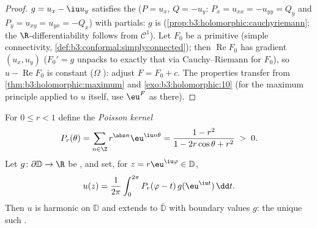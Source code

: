 \begin{proof}
$g = u_x - \iu u_y$ satisfies the 
($P = u_x$, $Q = -u_y$: $P_x = u_{xx} = -u_{yy} = Q_y$ and
$P_y = u_{xy} = u_{yx} = -Q_x$) with  partials: $g$
is  (\cref{prop:b3:holomorphic:cauchyriemann}; the
$\R$-differentiability follows from $\mathcal C^1$). Let $F_0$
be a primitive (simple connectivity,
\cref{def:b3:conformal:simplyconnected}); then
$\operatorname{Re}F_0$ has gradient $(u_x, u_y)$
($F_0' = g$ unpacks to exactly that via Cauchy--Riemann for
$F_0$), so $u - \operatorname{Re}F_0$ is constant ($\Omega$
): adjust $F = F_0 + c$. The properties transfer
from \cref{thm:b3:holomorphic:maximum} and
\cref{exo:b3:holomorphic:10} (for the maximum principle
applied to $u$ itself, use $\eu^{F}$ as there).
\end{proof}

\begin{theorem}\label{thm:b3:conformal:poisson}
For $0 \leq r < 1$ define the \emph{Poisson
kernel}
\[
P_r(\theta) = \sum_{n\in\Z}r^{\abs n}\eu^{\iu n\theta}
= \frac{1 - r^2}{1 - 2r\cos\theta + r^2} \;>\; 0 .
\]
Let $g \colon \partial\mathbb D \to \R$ be , and
set, for $z = r\eu^{\iu\varphi} \in \mathbb D$,
\[
u(z) = \frac1{2\pi}\int_0^{2\pi}
P_r(\varphi - t)\,g(\eu^{\iu t})\,\dd t .
\]
Then $u$ is harmonic on $\mathbb D$ and extends 
to $\bar{\mathbb D}$ with boundary values $g$: the unique such
.
\end{theorem}

